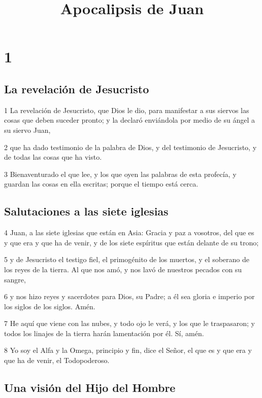 
\title{Apocalipsis de Juan}

\chapter{1}

\section*{La revelación de Jesucristo}

\par 1 La revelación de Jesucristo, que Dios le dio, para manifestar a sus siervos las cosas que deben suceder pronto; y la declaró enviándola por medio de su ángel a su siervo Juan,
\par 2 que ha dado testimonio de la palabra de Dios, y del testimonio de Jesucristo, y de todas las cosas que ha visto.
\par 3 Bienaventurado el que lee, y los que oyen las palabras de esta profecía, y guardan las cosas en ella escritas; porque el tiempo está cerca.

\section*{Salutaciones a las siete iglesias}

\par 4 Juan, a las siete iglesias que están en Asia: Gracia y paz a vosotros, del que es y que era y que ha de venir, y de los siete espíritus que están delante de su trono;
\par 5 y de Jesucristo el testigo fiel, el primogénito de los muertos, y el soberano de los reyes de la tierra. Al que nos amó, y nos lavó de nuestros pecados con su sangre,
\par 6 y nos hizo reyes y sacerdotes para Dios, su Padre; a él sea gloria e imperio por los siglos de los siglos. Amén.
\par 7 He aquí que viene con las nubes, y todo ojo le verá, y los que le traspasaron; y todos los linajes de la tierra harán lamentación por él. Sí, amén.
\par 8 Yo soy el Alfa y la Omega, principio y fin, dice el Señor, el que es y que era y que ha de venir, el Todopoderoso.

\section*{Una visión del Hijo del Hombre}

